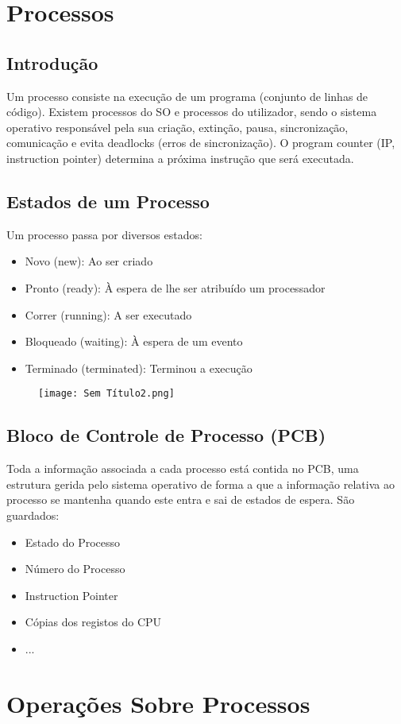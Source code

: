 \documentclass[10pt,a4paper]{report}
\begin{document}
\section{Processos}
\subsection{Introdução}
Um processo consiste na execução de um programa (conjunto de linhas de código). Existem processos do SO e processos do utilizador, sendo o sistema operativo responsável pela sua criação, extinção, pausa, sincronização, comunicação e evita deadlocks (erros de sincronização). O program counter (IP, instruction pointer) determina a próxima instrução que será executada.
\subsection{Estados de um Processo}
Um processo passa por diversos estados:
\begin{itemize}
\item Novo (new): Ao ser criado
\item Pronto (ready): À espera de lhe ser atribuído um processador
\item Correr (running): A ser executado
\item Bloqueado (waiting): À espera de um evento
\item Terminado (terminated): Terminou a execução
\end{itemize}
\begin{figure}[H]
\centering
\texttt{[image: Sem Título2.png]}
\end{figure}
\subsection{Bloco de Controle de Processo (PCB)}
Toda a informação associada a cada processo está contida no PCB, uma estrutura gerida pelo sistema operativo de forma a que a informação relativa ao processo se mantenha quando este entra e sai de estados de espera. São guardados:
\begin{itemize}
\item Estado do Processo
\item Número do Processo
\item Instruction Pointer
\item Cópias dos registos do CPU
\item ...
\end{itemize}
\section{Operações Sobre Processos}
\end{document}
